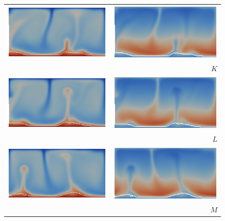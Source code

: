 \begin{figure}
\begin{center}
\begin{tabular}{c r}
\includegraphics[width=0.45\columnwidth]{chapters/vynnytska/png/tmK.png} &
\includegraphics[width=0.45\columnwidth]{chapters/vynnytska/png/visK.png} \\& $K$ \\
\includegraphics[width=0.45\columnwidth]{chapters/vynnytska/png/tmL.png} &
\includegraphics[width=0.45\columnwidth]{chapters/vynnytska/png/visL.png} \\& $L$ \\
\includegraphics[width=0.45\columnwidth]{chapters/vynnytska/png/tmM.png} &
\includegraphics[width=0.45\columnwidth]{chapters/vynnytska/png/visM.png} \\& $M$ \\

\end{tabular}
\end{center}
\end{figure}
